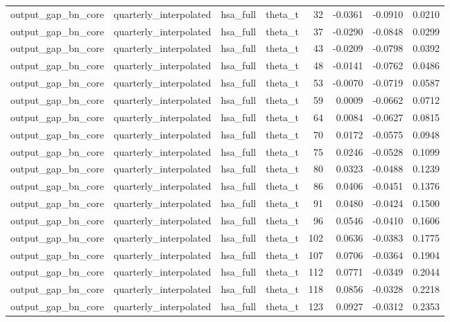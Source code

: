 \begin{tabular}{llllrrrr}
output\_gap\_bn\_core & quarterly\_interpolated & hsa\_full & theta\_t & 32 & -0.0361 & -0.0910 & 0.0210 \\
output\_gap\_bn\_core & quarterly\_interpolated & hsa\_full & theta\_t & 37 & -0.0290 & -0.0848 & 0.0299 \\
output\_gap\_bn\_core & quarterly\_interpolated & hsa\_full & theta\_t & 43 & -0.0209 & -0.0798 & 0.0392 \\
output\_gap\_bn\_core & quarterly\_interpolated & hsa\_full & theta\_t & 48 & -0.0141 & -0.0762 & 0.0486 \\
output\_gap\_bn\_core & quarterly\_interpolated & hsa\_full & theta\_t & 53 & -0.0070 & -0.0719 & 0.0587 \\
output\_gap\_bn\_core & quarterly\_interpolated & hsa\_full & theta\_t & 59 & 0.0009 & -0.0662 & 0.0712 \\
output\_gap\_bn\_core & quarterly\_interpolated & hsa\_full & theta\_t & 64 & 0.0084 & -0.0627 & 0.0815 \\
output\_gap\_bn\_core & quarterly\_interpolated & hsa\_full & theta\_t & 70 & 0.0172 & -0.0575 & 0.0948 \\
output\_gap\_bn\_core & quarterly\_interpolated & hsa\_full & theta\_t & 75 & 0.0246 & -0.0528 & 0.1099 \\
output\_gap\_bn\_core & quarterly\_interpolated & hsa\_full & theta\_t & 80 & 0.0323 & -0.0488 & 0.1239 \\
output\_gap\_bn\_core & quarterly\_interpolated & hsa\_full & theta\_t & 86 & 0.0406 & -0.0451 & 0.1376 \\
output\_gap\_bn\_core & quarterly\_interpolated & hsa\_full & theta\_t & 91 & 0.0480 & -0.0424 & 0.1500 \\
output\_gap\_bn\_core & quarterly\_interpolated & hsa\_full & theta\_t & 96 & 0.0546 & -0.0410 & 0.1606 \\
output\_gap\_bn\_core & quarterly\_interpolated & hsa\_full & theta\_t & 102 & 0.0636 & -0.0383 & 0.1775 \\
output\_gap\_bn\_core & quarterly\_interpolated & hsa\_full & theta\_t & 107 & 0.0706 & -0.0364 & 0.1904 \\
output\_gap\_bn\_core & quarterly\_interpolated & hsa\_full & theta\_t & 112 & 0.0771 & -0.0349 & 0.2044 \\
output\_gap\_bn\_core & quarterly\_interpolated & hsa\_full & theta\_t & 118 & 0.0856 & -0.0328 & 0.2218 \\
output\_gap\_bn\_core & quarterly\_interpolated & hsa\_full & theta\_t & 123 & 0.0927 & -0.0312 & 0.2353 \\

\end{tabular}
